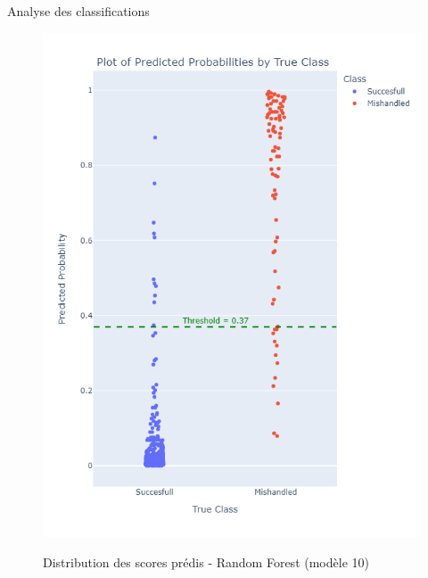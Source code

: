 \documentclass{beamer}
\begin{document}
\begin{frame}{Analyse des classifications}
\begin{figure}
\begin{minipage}[c]{0.4\linewidth}
    \includegraphics[width=1\textwidth]{Probability_distribution_Model 6.png}\\
    \caption{Distribution des scores prédis - Random Forest (modèle 10)}
\end{minipage}%
\end{figure}
\end{frame}
\end{document}
